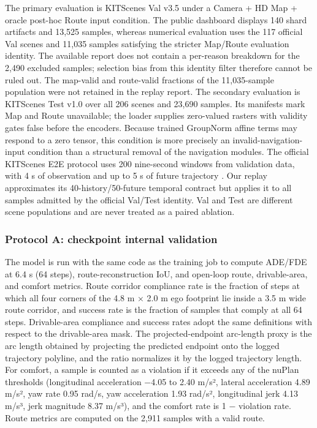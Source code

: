 \documentclass[
  english,
  10pt,
]{article}
\begin{document}
The primary evaluation is KITScenes Val v3.5 under a Camera + HD Map +
oracle post-hoc Route input condition. The public dashboard displays 140
shard artifacts and 13,525 samples, whereas numerical evaluation uses
the 117 official Val scenes and 11,035 samples satisfying the stricter
Map/Route evaluation identity. The available report does not contain a
per-reason breakdown for the 2,490 excluded samples; selection bias from
this identity filter therefore cannot be ruled out. The map-valid and
route-valid fractions of the 11,035-sample population were not retained
in the replay report. The secondary evaluation is KITScenes Test v1.0
over all 206 scenes and 23,690 samples. Its manifests mark Map and Route
unavailable; the loader supplies zero-valued rasters with validity gates
false before the encoders. Because trained GroupNorm affine terms may
respond to a zero tensor, this condition is more precisely an
invalid-navigation-input condition than a structural removal of the
navigation modules. The official KITScenes E2E protocol uses 200
nine-second windows from validation data, with 4 s of observation and up
to 5 s of future trajectory \hyperref[ref-kitscenes]{}. Our replay
approximates its 40-history/50-future temporal contract but applies it
to all samples admitted by the official Val/Test identity. Val and Test
are different scene populations and are never treated as a paired
ablation.

\subsubsection{Protocol A: checkpoint internal
validation}\label{protocol-a-checkpoint-internal-validation}

The model is run with the same code as the training job to compute
ADE/FDE at 6.4 s (64 steps), route-reconstruction IoU, and open-loop
route, drivable-area, and comfort metrics. Route corridor compliance
rate is the fraction of steps at which all four corners of the 4.8 m ×
2.0 m ego footprint lie inside a 3.5 m wide route corridor, and success
rate is the fraction of samples that comply at all 64 steps.
Drivable-area compliance and success rates adopt the same definitions
with respect to the drivable-area mask. The projected-endpoint
arc-length proxy is the arc length obtained by projecting the predicted
endpoint onto the logged trajectory polyline, and the ratio normalizes
it by the logged trajectory length. For comfort, a sample is counted as
a violation if it exceeds any of the nuPlan thresholds (longitudinal
acceleration −4.05 to 2.40 m/s², lateral acceleration 4.89 m/s², yaw
rate 0.95 rad/s, yaw acceleration 1.93 rad/s², longitudinal jerk 4.13
m/s³, jerk magnitude 8.37 m/s³), and the comfort rate is 1 − violation
rate. Route metrics are computed on the 2,911 samples with a valid
route.
\end{document}
